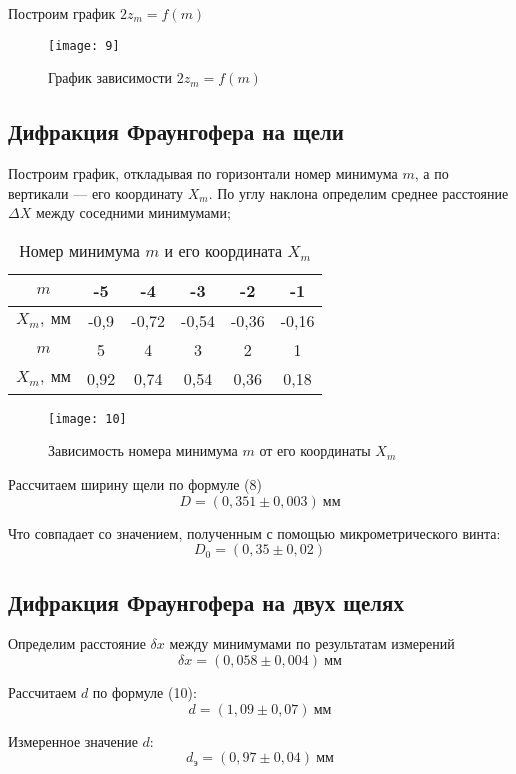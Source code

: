 \documentclass[a4paper, 12pt]{article}
\begin{document}
Построим график $2z_m = f(m)$

\begin{figure}[H]
    \texttt{[image: 9]} 
    \caption{График зависимости $2z_m = f(m)$}
\end{figure}

\subsection*{Дифракция Фраунгофера на щели}

Построим график, откладывая по горизонтали номер минимума $m$, а по
вертикали --- его координату $X_m$. По углу наклона определим среднее
расстояние $\Delta X$ между соседними минимумами; 

\begin{table}[H]
\centering
\begin{tabular}{|c|c|c|c|c|c|}
    \hline 
$m$  & -5   & -4    & -3    & -2    & -1    \\ \hline
$X_m,\ \text{мм}$ & -0,9 & -0,72 & -0,54 & -0,36 & -0,16 \\ \hline
$m$  & 5    & 4     & 3     & 2     & 1     \\ \hline
$X_m,\ \text{мм}$ & 0,92 & 0,74  & 0,54  & 0,36  & 0,18  \\ \hline
\end{tabular}
\caption{Номер минимума $m$ и его координата $X_m$}
\end{table}


\begin{figure}[H]
    \texttt{[image: 10]} 
    \caption{Зависимость номера минимума $m$ от его координаты $X_m$}
\end{figure}

Рассчитаем ширину щели по формуле (8)
\[
    D = (0,351\pm0,003)\ \text{мм}
\]

Что совпадает со значением, полученным с помощью микрометрического
винта:
\[
    D_0 = (0,35 \pm 0,02)
\]


\subsection*{Дифракция Фраунгофера на двух щелях}
Определим расстояние $\delta x$ между минимумами по результатам
измерений 
\[
    \delta x = (0,058 \pm 0,004)\ \text{мм}
\]

Рассчитаем $d$ по формуле (10):
\[
    d = (1,09 \pm 0,07)\ \text{мм} 
\]

Измеренное значение $d$:
\[
    d_\text{э} = (0,97 \pm 0,04)\ \text{мм}
\]
\end{document}
